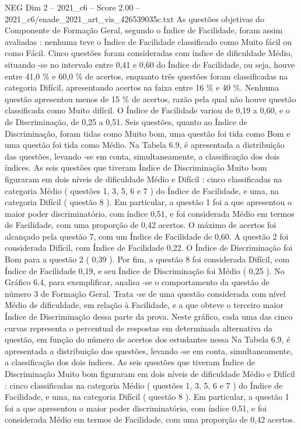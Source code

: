 \begin{textsample}{NEG Dim 2 – 2021\_c6 – Score 2.00 – 2021\_c6/enade\_2021\_art\_vis\_426539035c.txt}
As questões objetivas do Componente de Formação Geral, segundo o Índice de Facilidade, foram assim avaliadas : nenhuma teve o Índice de Facilidade classificado como Muito fácil ou como Fácil.
Cinco questões foram consideradas com índice de dificuldade Médio, situando -se no intervalo entre 0,41 e 0,60 do Índice de Facilidade, ou seja, houve entre 41,0 \% e 60,0 \% de acertos, enquanto três questões foram classificadas na categoria Difícil, apresentando acertos na faixa entre 16 \% e 40 \%.
Nenhuma questão apresentou menos de 15 \% de acertos, razão pela qual não houve questão classificada como Muito difícil.
O Índice de Facilidade variou de 0,19 a 0,60, e o de Discriminação, de 0,25 a 0,51.
Seis questões, quanto ao Índice de Discriminação, foram tidas como Muito bom, uma questão foi tida como Bom e uma questão foi tida como Médio.
Na Tabela 6.9, é apresentada a distribuição das questões, levando -se em conta, simultaneamente, a classificação dos dois índices.
As seis questões que tiveram Índice de Discriminação Muito bom figuraram em dois níveis de dificuldade Médio e Difícil : cinco classificadas na categoria Médio ( questões 1, 3, 5, 6 e 7 ) do Índice de Facilidade, e uma, na categoria Difícil ( questão 8 ).
Em particular, a questão 1 foi a que apresentou o maior poder discriminatório, com índice 0,51, e foi considerada Médio em termos de Facilidade, com uma proporção de 0,42 acertos.
O máximo de acertos foi alcançado pela questão 7, com um Índice de Facilidade de 0,60.
A questão 2 foi considerada Difícil, com Índice de Facilidade 0,22.
O Índice de Discriminação foi Bom para a questão 2 ( 0,39 ).
Por fim, a questão 8 foi considerada Difícil, com Índice de Facilidade 0,19, e seu Índice de Discriminação foi Médio ( 0,25 ).
No Gráfico 6.4, para exemplificar, analisa -se o comportamento da questão de número 3 de Formação Geral.
Trata -se de uma questão considerada com nível Médio de dificuldade, em relação à Facilidade, e a que obteve o terceiro maior Índice de Discriminação dessa parte da prova.
Neste gráfico, cada uma das cinco curvas representa o percentual de respostas em determinada alternativa da questão, em função do número de acertos dos estudantes nessa Na Tabela 6.9, é apresentada a distribuição das questões, levando -se em conta, simultaneamente, a classificação dos dois índices.
As seis questões que tiveram Índice de Discriminação Muito bom figuraram em dois níveis de dificuldade Médio e Difícil : cinco classificadas na categoria Médio ( questões 1, 3, 5, 6 e 7 ) do Índice de Facilidade, e uma, na categoria Difícil ( questão 8 ).
Em particular, a questão 1 foi a que apresentou o maior poder discriminatório, com índice 0,51, e foi considerada Médio em termos de Facilidade, com uma proporção de 0,42 acertos.

\end{textsample}
